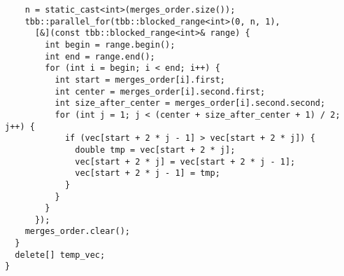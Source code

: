 \documentclass{report}
\begin{document}
\begin{lstlisting}
    n = static_cast<int>(merges_order.size());
    tbb::parallel_for(tbb::blocked_range<int>(0, n, 1),
      [&](const tbb::blocked_range<int>& range) {
        int begin = range.begin();
        int end = range.end();
        for (int i = begin; i < end; i++) {
          int start = merges_order[i].first;
          int center = merges_order[i].second.first;
          int size_after_center = merges_order[i].second.second;
          for (int j = 1; j < (center + size_after_center + 1) / 2; j++) {
            if (vec[start + 2 * j - 1] > vec[start + 2 * j]) {
              double tmp = vec[start + 2 * j];
              vec[start + 2 * j] = vec[start + 2 * j - 1];
              vec[start + 2 * j - 1] = tmp;
            }
          }
        }
      });
    merges_order.clear();
  }
  delete[] temp_vec;
}
\end{lstlisting}
\end{document}
